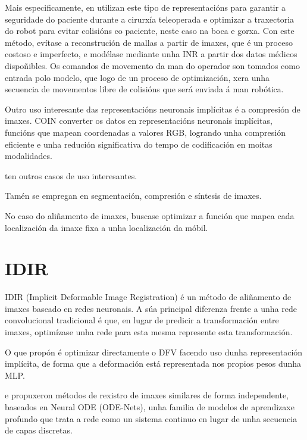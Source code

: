Mais especificamente, en \cite{teleoperatdrob} utilizan este tipo de representacións para garantir a seguridade do paciente durante a cirurxía teleoperada e optimizar a traxectoria do robot para evitar colisións co paciente, neste caso na boca e gorxa.
Con este método, evítase a reconstrución de mallas a partir de imaxes, que é un proceso costoso e imperfecto, e modélase mediante unha INR a partir dos datos médicos dispoñibles.
Os comandos de movemento da man do operador son tomados como entrada polo modelo, que logo de un proceso de optimización, xera unha secuencia de movementos libre de colisións que será enviada á man robótica.

Outro uso interesante das representacións neuronais implícitas é a compresión de imaxes. COIN \cite{coin} converter os datos en representacións neuronais implícitas, funcións que mapean coordenadas a valores RGB, logrando unha compresión eficiente e unha redución significativa do tempo de codificación en moitas modalidades.

\cite{velikova2024implicitneuralrepresentationsbreathingcompensated} ten outros casos de uso interesantes.

Tamén se empregan en segmentación, compresión e síntesis de imaxes.

No caso do aliñamento de imaxes, buscase optimizar a función que mapea cada localización da imaxe fixa a unha localización da móbil.

\section{IDIR}
\label{sec:IDIR}
IDIR (Implicit Deformable Image Registration) é un método de aliñamento de imaxes baseado en redes neuronais. 
A súa principal diferenza frente a unha rede convolucional tradicional é que, 
en lugar de predicir a transformación entre imaxes, optimízase unha rede para esta mesma represente esta transformación.

O que \cite{wolterink2021implicit} propón é optimizar directamente o DFV facendo uso
 dunha representación implícita, de forma que a deformación está representada nos propios pesos dunha MLP.

 \cite{sun2024medicalimageregistrationneural} e \cite{nodeo} propuxeron métodos de rexistro de imaxes similares de forma independente,
 baseados en Neural ODE (ODE-Nets)\cite{neuralode}, unha familia de modelos de aprendizaxe profundo que trata a rede como un sistema continuo en lugar de unha secuencia de capas discretas.


